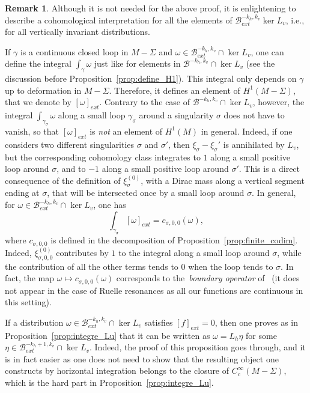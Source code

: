 \documentclass[11pt, a4paper, oneside, final, pagebackref]{amsart}
\newcommand{\boB}{\mathcal{B}}
\theoremstyle{definition}
\newtheorem{rmk}[thm]{Remark}
\numberwithin{equation}{section}
\begin{document}
\begin{rmk}
\label{rmk:cohomological} Although it is not needed for the above proof, it
is enlightening to describe a cohomological interpretation for all the
elements of $\boB^{-k_h, k_v}_{ext} \ker L_v$, i.e., for all vertically
invariant distributions.

If $\gamma$ is a continuous closed loop in $M-\Sigma$ and $\omega \in
\boB^{-k_h, k_v}_{ext} \cap \ker L_v$, one can define the integral
$\int_\gamma \omega$ just like for elements in $\boB^{-k_h, k_v} \cap \ker
L_v$ (see the discussion before Proposition~\ref{prop:define_H1}). This
integral only depends on $\gamma$ up to deformation in $M-\Sigma$. Therefore,
it defines an element of $H^1(M-\Sigma)$, that we denote by $[\omega]_{ext}$.
Contrary to the case of $\boB^{-k_h, k_v} \cap \ker L_v$, however, the
integral $\int_{\gamma_\sigma} \omega$ along a small loop $\gamma_\sigma$
around a singularity $\sigma$ does not have to vanish, so that
$[\omega]_{ext}$ is \emph{not} an element of $H^1(M)$ in general. Indeed, if
one considers two different singularities $\sigma$ and $\sigma'$, then
$\xi_\sigma-\xi_\sigma'$ is annihilated by $L_v$, but the corresponding
cohomology class integrates to $1$ along a small positive loop around
$\sigma$, and to $-1$ along a small positive loop around $\sigma'$. This is a
direct consequence of the definition of $\xi_\sigma^{(0)}$, with a Dirac mass
along a vertical segment ending at $\sigma$, that will be intersected once by
a small loop around $\sigma$. In general, for $\omega \in \boB^{-k_h,
k_v}_{ext} \cap \ker L_v$, one has
\begin{equation}
\label{eq:pwuixcvpoiupwoxv}
  \int_{\gamma_\sigma} [\omega]_{ext} = c_{\sigma, 0, 0}(\omega),
\end{equation}
where $c_{\sigma, 0, 0}$ is defined in the decomposition of
Proposition~\ref{prop:finite_codim}. Indeed, $\xi^{(0)}_{\sigma, 0, 0}$
contributes by $1$ to the integral along a small loop around $\sigma$, while
the contribution of all the other terms tends to $0$ when the loop tends to
$\sigma$. In fact, the map $\omega \mapsto c_{\sigma, 0, 0}(\omega)$ corresponds
to the~\emph{boundary operator} of~\cite{marmi_yoccoz_Holder} (it does not appear
in the case of Ruelle resonances as all our functions are continuous
in this setting).

If a distribution $\omega \in \boB^{-k_h, k_v}_{ext} \cap \ker L_v$ satisfies
$[f]_{ext} = 0$, then one proves as in Proposition~\ref{prop:integre_Lu} that
it can be written as $\omega=L_h \eta$ for some $\eta \in \boB_{ext}^{-k_h+1,
k_v} \cap \ker L_v$. Indeed, the proof of this proposition goes through, and
it is in fact easier as one does not need to show that the resulting object
one constructs by horizontal integration belongs to the closure of
$C_c^\infty(M-\Sigma)$, which is the hard part in
Proposition~\ref{prop:integre_Lu}.


\end{rmk}
\end{document}
